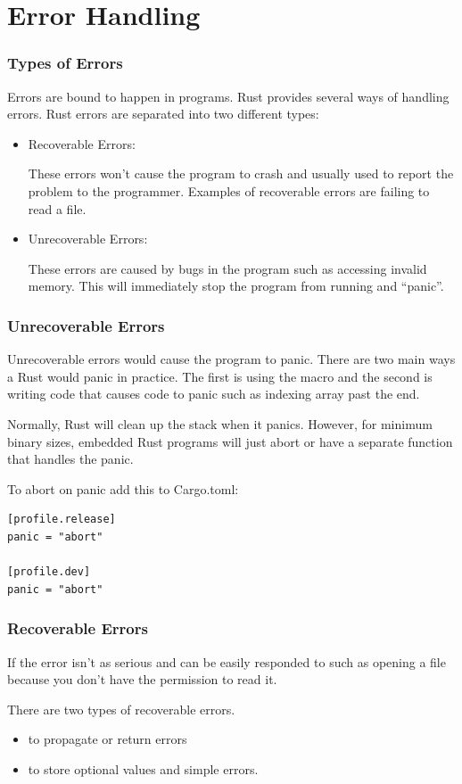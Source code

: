 \documentclass{beamer}
\begin{document}
\section{Error Handling}
\begin{frame}
  \frametitle{Types of Errors}
  Errors are bound to happen in programs. Rust provides several ways of handling errors. Rust errors are separated into two different types:
  \begin{itemize}
    \item{Recoverable Errors:

          These errors won't cause the program to crash and usually used to report the problem to the programmer. Examples of recoverable errors are failing to read a file.}
    \item{Unrecoverable Errors:

          These errors are caused by bugs in the program such as accessing invalid memory. This will immediately stop the program from running and ``panic''.}
  \end{itemize}
\end{frame}

\begin{frame}
  \frametitle{Unrecoverable Errors}
  Unrecoverable errors would cause the program to panic. There are two main ways a Rust would panic in practice. The first is using the  macro and the second is writing code that causes code to panic such as indexing array past the end.
  
  Normally, Rust will clean up the stack when it panics. However, for minimum binary sizes, embedded Rust programs will just abort or have a separate function that handles the panic.

  \pagebreak

  To abort on panic add this to Cargo.toml:

\begin{lstlisting}
[profile.release]
panic = "abort"

[profile.dev]
panic = "abort"
\end{lstlisting}
\end{frame}

\begin{frame}
  \frametitle{Recoverable Errors}
  If the error isn't as serious and can be easily responded to such as opening a file because you don't have the permission to read it.

  There are two types of recoverable errors.
  \begin{itemize}
    \item{ to propagate or return errors}
    \item{ to store optional values and simple errors.}
  \end{itemize}
\end{frame}
\end{document}
